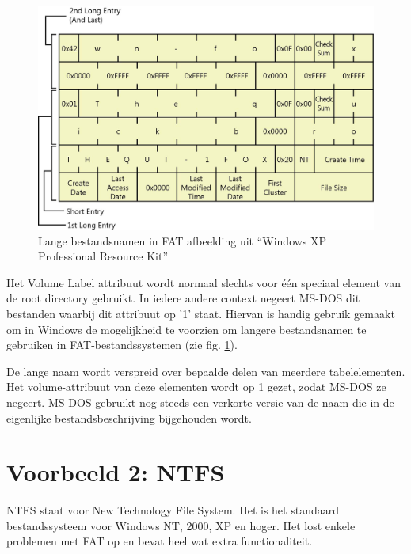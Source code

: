 \begin{figure}
\begin{center}
\includegraphics[width=\textwidth]{images/fig0415.jpg}
\caption{Lange bestandsnamen in FAT \tiny{afbeelding uit ``Windows XP Professional Resource Kit''}}
\label{fatlangnaam}
\end{center}
\end{figure}


Het Volume Label attribuut wordt normaal slechts voor \'e\'en
speciaal element van de root directory gebruikt. In iedere andere
context negeert MS-DOS dit bestanden waarbij dit attribuut op '1'
staat. Hiervan is handig gebruik gemaakt om in Windows de mogelijkheid
te voorzien om langere bestandsnamen te gebruiken in
FAT-bestandssystemen (zie fig. \ref{fatlangnaam}).

De lange naam wordt verspreid over bepaalde delen van meerdere
tabelelementen. Het volume-attribuut van deze elementen wordt op 1
gezet, zodat MS-DOS ze negeert. MS-DOS gebruikt nog steeds een
verkorte versie van de naam die in de eigenlijke bestandsbeschrijving
bijgehouden wordt.

\section{Voorbeeld 2: NTFS}


NTFS staat voor New Technology File System. Het is het standaard
bestandssysteem voor Windows NT, 2000, XP en hoger. Het lost
enkele problemen met FAT op en bevat heel wat extra
functionaliteit.

